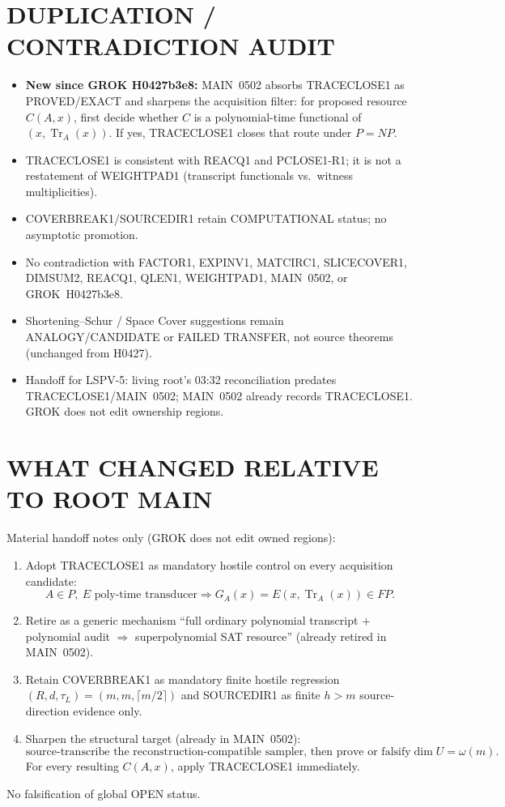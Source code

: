 \documentclass[11pt]{article}
\begin{document}
\section*{DUPLICATION / CONTRADICTION AUDIT}
\begin{itemize}
\item \textbf{New since GROK H0427b3e8:} MAIN~0502 absorbs TRACECLOSE1 as PROVED/EXACT
and sharpens the acquisition filter: for proposed resource $C(A,x)$, first decide whether
$C$ is a polynomial-time functional of $(x,\operatorname{Tr}_A(x))$. If yes, TRACECLOSE1
closes that route under $P=NP$.
\item TRACECLOSE1 is consistent with REACQ1 and PCLOSE1-R1; it is not a restatement of
WEIGHTPAD1 (transcript functionals vs.\ witness multiplicities).
\item COVERBREAK1/SOURCEDIR1 retain COMPUTATIONAL status; no asymptotic promotion.
\item No contradiction with FACTOR1, EXPINV1, MATCIRC1, SLICECOVER1, DIMSUM2, REACQ1,
QLEN1, WEIGHTPAD1, MAIN~0502, or GROK~H0427b3e8.
\item Shortening--Schur / Space Cover suggestions remain ANALOGY/CANDIDATE or FAILED
TRANSFER, not source theorems (unchanged from H0427).
\item Handoff for LSPV-5: living root's 03:32 reconciliation predates TRACECLOSE1/MAIN~0502;
MAIN~0502 already records TRACECLOSE1. GROK does not edit ownership regions.
\end{itemize}

\section*{WHAT CHANGED RELATIVE TO ROOT MAIN}
Material handoff notes only (GROK does not edit owned regions):
\begin{enumerate}
\item Adopt TRACECLOSE1 as mandatory hostile control on every acquisition candidate:
\[
A\in P,\ E\text{ poly-time transducer}
\Longrightarrow
G_A(x)=E(x,\operatorname{Tr}_A(x))\in FP.
\]
\item Retire as a generic mechanism
``full ordinary polynomial transcript $+$ polynomial audit $\Rightarrow$ superpolynomial SAT
resource'' (already retired in MAIN~0502).
\item Retain COVERBREAK1 as mandatory finite hostile regression
$(R,d,\tau_L)=(m,m,\lceil m/2\rceil)$ and SOURCEDIR1 as finite $h>m$ source-direction
evidence only.
\item Sharpen the structural target (already in MAIN~0502):
\[
\boxed{\text{source-transcribe the reconstruction-compatible sampler, then prove or falsify
}\dim U=\omega(m).}
\]
For every resulting $C(A,x)$, apply TRACECLOSE1 immediately.
\end{enumerate}
No falsification of global OPEN status.
\end{document}
